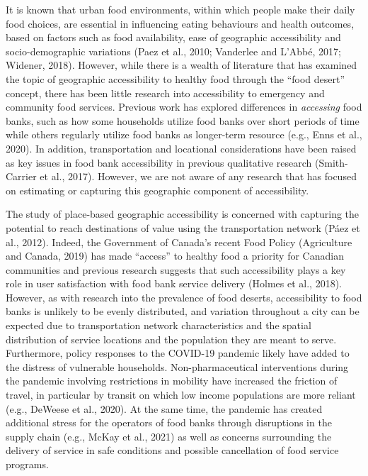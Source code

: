 \documentclass[]{elsarticle} %
\begin{document}
It is known that urban food environments, within which people make their
daily food choices, are essential in influencing eating behaviours and
health outcomes, based on factors such as food availability, ease of
geographic accessibility and socio-demographic variations (Paez et al.,
2010; Vanderlee and L'Abbé, 2017; Widener, 2018). However, while there
is a wealth of literature that has examined the topic of geographic
accessibility to healthy food through the ``food desert'' concept, there
has been little research into accessibility to emergency and community
food services. Previous work has explored differences in
\emph{accessing} food banks, such as how some households utilize food
banks over short periods of time while others regularly utilize food
banks as longer-term resource (e.g., Enns et al., 2020). In addition,
transportation and locational considerations have been raised as key
issues in food bank accessibility in previous qualitative research
(Smith-Carrier et al., 2017). However, we are not aware of any research
that has focused on estimating or capturing this geographic component of
accessibility.

The study of place-based geographic accessibility is concerned with
capturing the potential to reach destinations of value using the
transportation network (Páez et al., 2012). Indeed, the Government of
Canada's recent Food Policy (Agriculture and Canada, 2019) has made
``access'' to healthy food a priority for Canadian communities and
previous research suggests that such accessibility plays a key role in
user satisfaction with food bank service delivery (Holmes et al., 2018).
However, as with research into the prevalence of food deserts,
accessibility to food banks is unlikely to be evenly distributed, and
variation throughout a city can be expected due to transportation
network characteristics and the spatial distribution of service
locations and the population they are meant to serve. Furthermore,
policy responses to the COVID-19 pandemic likely have added to the
distress of vulnerable households. Non-pharmaceutical interventions
during the pandemic involving restrictions in mobility have increased
the friction of travel, in particular by transit on which low income
populations are more reliant (e.g., DeWeese et al., 2020). At the same
time, the pandemic has created additional stress for the operators of
food banks through disruptions in the supply chain (e.g., McKay et al.,
2021) as well as concerns surrounding the delivery of service in safe
conditions and possible cancellation of food service programs.
\end{document}

